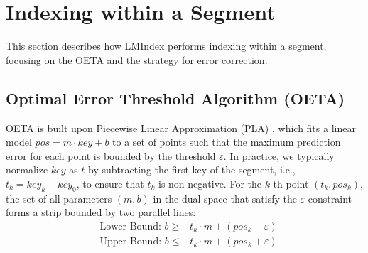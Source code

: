 
\section{Indexing within a Segment}
\label{sec:single-model}
This section describes how LMIndex performs indexing within a segment, focusing on the OETA and the strategy for error correction.

\subsection{Optimal Error Threshold Algorithm (OETA)}
\label{sec:oeta}

OETA is built upon Piecewise Linear Approximation (PLA) \cite{line81}, which fits a linear model $pos = m \cdot key + b$ to a set of points such that the maximum prediction error for each point is bounded by the threshold $\varepsilon$. In practice, we typically normalize $key$ as $t$ by subtracting the first key of the segment, i.e., $t_k = key_k - key_0$, to ensure that $t_k$ is non-negative. For the $k$-th point $(t_k, pos_k)$, the set of all parameters $(m, b)$ in the dual space that satisfy the $\varepsilon$-constraint forms a strip bounded by two parallel lines:
\begin{equation}
\begin{aligned}
&\text{Lower Bound: }b \ge -t_k \cdot m + (pos_k - \varepsilon) \\
&\text{Upper Bound: }b \le -t_k \cdot m + (pos_k + \varepsilon)
\end{aligned}
\end{equation}

